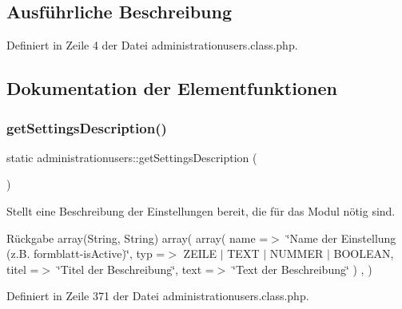 \subsection{Ausführliche Beschreibung}


Definiert in Zeile 4 der Datei administrationusers.\+class.\+php.



\subsection{Dokumentation der Elementfunktionen}
\mbox{\label{classadministrationusers_ab6c2258f5a6ec98200295848ca510a5c}} 
\subsubsection{\texorpdfstring{get\+Settings\+Description()}{getSettingsDescription()}}
{\footnotesize\ttfamily static administrationusers\+::get\+Settings\+Description (\begin{DoxyParamCaption}{ }\end{DoxyParamCaption})\hspace{0.3cm}{\ttfamily [static]}}

Stellt eine Beschreibung der Einstellungen bereit, die für das Modul nötig sind. \begin{DoxyReturn}{Rückgabe}
array(\+String, String) array( array( \textquotesingle{}name\textquotesingle{} =$>$ \char`\"{}\+Name der Einstellung (z.\+B. formblatt-\/is\+Active)\char`\"{}, \textquotesingle{}typ\textquotesingle{} =$>$ Z\+E\+I\+LE $\vert$ T\+E\+XT $\vert$ N\+U\+M\+M\+ER $\vert$ B\+O\+O\+L\+E\+AN, \textquotesingle{}titel\textquotesingle{} =$>$ \char`\"{}\+Titel der Beschreibung\char`\"{}, \textquotesingle{}text\textquotesingle{} =$>$ \char`\"{}\+Text der Beschreibung\char`\"{} ) , ) 
\end{DoxyReturn}


Definiert in Zeile 371 der Datei administrationusers.\+class.\+php.

\mbox{\label{classadministrationusers_ad37fa65a3d9e456fb2f6bb9b489c55f8}} 
